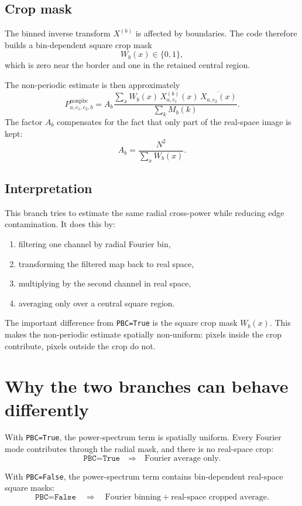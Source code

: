 \documentclass[11pt]{article}
\begin{document}
\subsection*{Crop mask}

The binned inverse transform $X^{(b)}$ is affected by boundaries. The code
therefore builds a bin-dependent square crop mask
\[
  W_b(x)\in\{0,1\},
\]
which is zero near the border and one in the retained central region.

The non-periodic estimate is then approximately
\[
  P^{\mathrm{nonpbc}}_{a,c_1,c_2,b}
  =
  A_b
  \frac{
    \sum_x
    W_b(x)\,
    X^{(b)}_{a,c_1}(x)\,
    \overline{X_{a,c_2}(x)}
  }{
    \sum_k M_b(k)
  }.
\]
The factor $A_b$ compensates for the fact that only part of the real-space
image is kept:
\[
  A_b
  =
  \frac{N^2}{\sum_x W_b(x)}.
\]

\subsection*{Interpretation}

This branch tries to estimate the same radial cross-power while reducing edge
contamination. It does this by:
\begin{enumerate}[label=\arabic*.]
  \item filtering one channel by radial Fourier bin,
  \item transforming the filtered map back to real space,
  \item multiplying by the second channel in real space,
  \item averaging only over a central square region.
\end{enumerate}

The important difference from \texttt{PBC=True} is the square crop mask
$W_b(x)$. This makes the non-periodic estimate spatially non-uniform: pixels
inside the crop contribute, pixels outside the crop do not.

\section{Why the two branches can behave differently}

With \texttt{PBC=True}, the power-spectrum term is spatially uniform. Every
Fourier mode contributes through the radial mask, and there is no real-space
crop:
\[
  \texttt{PBC=True}
  \quad\Rightarrow\quad
  \text{Fourier average only.}
\]

With \texttt{PBC=False}, the power-spectrum term contains bin-dependent
real-space square masks:
\[
  \texttt{PBC=False}
  \quad\Rightarrow\quad
  \text{Fourier binning} + \text{real-space cropped average.}
\]
\end{document}
